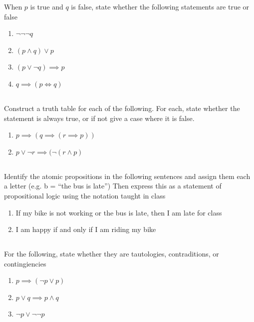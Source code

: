 \documentclass[twocolumn]{article}
\begin{document}
When $p$ is true and $q$ is false, state whether the following statements are true or false

\begin{enumerate}
    \item $\neg \neg \neg q$
    \item $(p \wedge q) \vee p$
    \item $(p \vee \neg q) \implies p$
    \item $q \implies (p \Leftrightarrow q)$
\end{enumerate}

\subsection{}

Construct a truth table for each of the following. For each, state whether the statement is always true, or if not give a case where it is false.

\begin{enumerate}
    \item $ p \implies (q \implies ( r \implies p )) $
    \item $ p \vee \neg r \implies (\neg ( r \wedge p ) $
\end{enumerate}

\subsection{}

Identify the atomic propositions in the following sentences and assign them each a letter (e.g. b = ``the bus is late'') Then express this as a statement of propositional logic using the notation taught in class

\begin{enumerate}
    \item If my bike is not working or the bus is late, then I am late for class
    \item I am happy if and only if I am riding my bike
\end{enumerate}

\subsection{}

For the following, state whether they are tautologies, contraditions, or contingiencies

\begin{enumerate}
    \item $p \implies (\neg p \vee p)$
    \item $p \vee q \implies p \wedge q$
    \item $\neg p \vee \neg\neg p$
\end{enumerate}
\end{document}

